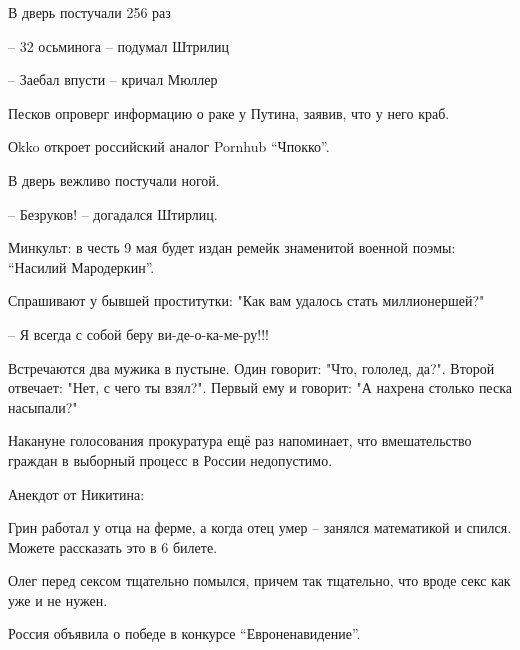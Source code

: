 В дверь постучали 256 раз

-- 32 осьминога -- подумал Штрилиц

-- Заебал впусти -- кричал Мюллер

\bigbreak

Песков опроверг информацию о раке у Путина, заявив, что у него краб.





\bigbreak

Оkko откроет российский аналог Pornhub ``Чпокко''.

\bigbreak

В дверь вежливо постучали ногой.

-- Безруков! -- догадался Штирлиц.

\bigbreak

Минкульт: в честь 9 мая будет издан ремейк знаменитой военной поэмы: ``Насилий Мародеркин''.

\bigbreak

Спрашивают у бывшей проститутки: "Как вам удалось стать миллионершей?"

-- Я всегда с собой беру ви-де-о-ка-ме-ру!!!

\bigbreak

Встречаются два мужика в пустыне. Один говорит: "Что, гололед, да?". Второй отвечает: "Нет, с чего ты взял?". Первый ему и говорит: "А нахрена столько песка насыпали?"

\bigbreak

Накануне голосования прокуратура ещё раз напоминает, что вмешательство граждан в выборный процесс в России недопустимо.

\bigbreak

Анекдот от Никитина:

Грин работал у отца на ферме, а когда отец умер -- занялся математикой и спился. Можете рассказать это в 6 билете.

\bigbreak

Олег перед сексом тщательно помылся, причем так тщательно, что вроде секс как уже и не нужен.

\bigbreak

Россия объявила о победе в конкурсе ``Евроненавидение''.

\bigbreak

